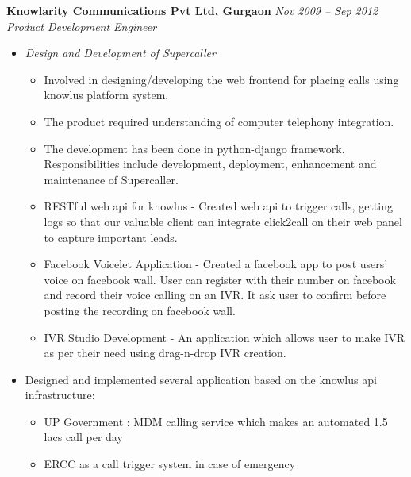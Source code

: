 \documentclass[margin,line]{resume}
\begin{document}
\begin{resume}
   \textbf{Knowlarity Communications Pvt Ltd, Gurgaon}   \hfill \textsl{Nov 2009 -- Sep 2012} \vspace{0mm}\\\vspace{0mm}%
           \textsl{Product Development Engineer}\\
    \begin{itemize}
    
     \item \textsl{Design and Development of Supercaller} 
        \begin{itemize}
            \item Involved in designing/developing the web frontend for placing calls using knowlus platform system.
            \item The product required understanding of computer telephony integration.
            \item The development has been done in python-django framework. Responsibilities include development, deployment, enhancement and maintenance of Supercaller.
            \item RESTful web api for knowlus - Created web api to trigger calls, getting logs so that our valuable client can integrate click2call on their web panel to capture important leads.
            \item Facebook Voicelet Application - Created a facebook app to post users' voice on facebook wall. User can register with their number on facebook and record their voice calling on an IVR. It ask user to confirm before posting the recording on facebook wall.
            \item IVR Studio Development - An application which allows user to make IVR as per their need using drag-n-drop IVR creation.
        \end{itemize}

     \item Designed and implemented several application based on the knowlus api infrastructure:
        \begin{itemize}
        \item UP Government : MDM calling service which makes an automated 1.5 lacs call per day
         \item ERCC as a call trigger system in case of emergency
        \end{itemize}
    \end{itemize}


\end{resume}
\end{document}
